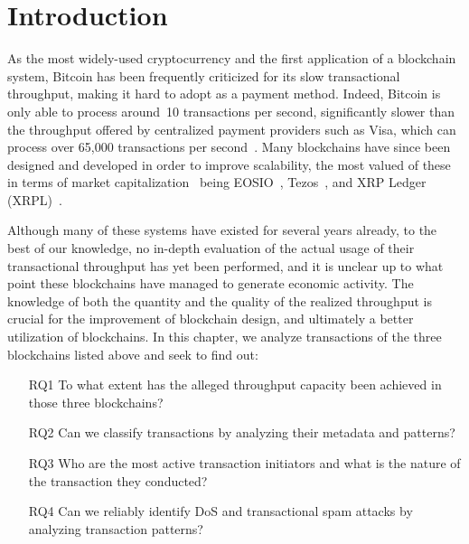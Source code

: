 
\section{Introduction}
\label{sec:introduction}

As the most widely-used cryptocurrency and the first application of a blockchain system, Bitcoin has been frequently criticized for its slow transactional throughput, making it hard to adopt as a payment method.
Indeed, Bitcoin is only able to process around~10 transactions per second, significantly slower than the throughput offered by centralized payment providers such as Visa, which can process over 65,000 transactions per second~\cite{visa-tps}.
Many blockchains have since been designed and developed in order to improve scalability, the most valued of these in terms of market capitalization~\cite{CoinMarketCap2020} being EOSIO~\cite{EOS}, Tezos~\cite{Goodman2014}, and XRP Ledger (XRPL)~\cite{xrp_ledger_overview}. 

Although many of these systems have existed for several years already, to the best of our knowledge, no in-depth evaluation of the actual usage of their transactional throughput has yet been performed, and it is unclear up to what point these blockchains have managed to generate economic activity.
The knowledge of both the quantity and the quality of the realized throughput is crucial for the improvement of blockchain design, and ultimately a better utilization of blockchains.
In this chapter, we analyze transactions of the three blockchains listed above and seek to find out:

\begin{enumerate}
    \item[RQ1] To what extent has the alleged throughput capacity been achieved in those three blockchains?
    \item[RQ2] Can we classify transactions by analyzing their metadata and patterns?
    \item[RQ3] Who are the most active transaction initiators and what is the nature of the transaction they conducted?
    \item[RQ4] Can we reliably identify DoS and transactional spam attacks by analyzing transaction patterns?
\end{enumerate}

